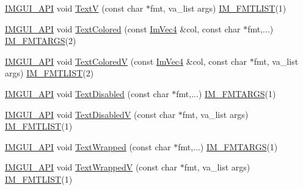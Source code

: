 \begin{DoxyCompactItemize}
\item 
\mbox{\hyperlink{imgui_8h_a43829975e84e45d1149597467a14bbf5}{I\+M\+G\+U\+I\+\_\+\+A\+PI}} void \mbox{\hyperlink{namespace_im_gui_a10a0d6362178c2f743092f21e1b6cd20}{TextV}} (const char $\ast$fmt, va\+\_\+list args) \mbox{\hyperlink{imgui_8h_a047693beb7f899f5deab1e20202016b3}{I\+M\+\_\+\+F\+M\+T\+L\+I\+ST}}(1)
\item 
\mbox{\hyperlink{imgui_8h_a43829975e84e45d1149597467a14bbf5}{I\+M\+G\+U\+I\+\_\+\+A\+PI}} void \mbox{\hyperlink{namespace_im_gui_a36ab8fcad68b26863d6e910755de04c2}{Text\+Colored}} (const \mbox{\hyperlink{struct_im_vec4}{Im\+Vec4}} \&col, const char $\ast$fmt,...) \mbox{\hyperlink{imgui_8h_a1251c2f9ddac0873dbad8181bd82c9f1}{I\+M\+\_\+\+F\+M\+T\+A\+R\+GS}}(2)
\item 
\mbox{\hyperlink{imgui_8h_a43829975e84e45d1149597467a14bbf5}{I\+M\+G\+U\+I\+\_\+\+A\+PI}} void \mbox{\hyperlink{namespace_im_gui_a87c24ece994188a7145d8feecb4439ed}{Text\+ColoredV}} (const \mbox{\hyperlink{struct_im_vec4}{Im\+Vec4}} \&col, const char $\ast$fmt, va\+\_\+list args) \mbox{\hyperlink{imgui_8h_a047693beb7f899f5deab1e20202016b3}{I\+M\+\_\+\+F\+M\+T\+L\+I\+ST}}(2)
\item 
\mbox{\hyperlink{imgui_8h_a43829975e84e45d1149597467a14bbf5}{I\+M\+G\+U\+I\+\_\+\+A\+PI}} void \mbox{\hyperlink{namespace_im_gui_aa96bf14c5fa288e106820aeb4ba7fcb6}{Text\+Disabled}} (const char $\ast$fmt,...) \mbox{\hyperlink{imgui_8h_a1251c2f9ddac0873dbad8181bd82c9f1}{I\+M\+\_\+\+F\+M\+T\+A\+R\+GS}}(1)
\item 
\mbox{\hyperlink{imgui_8h_a43829975e84e45d1149597467a14bbf5}{I\+M\+G\+U\+I\+\_\+\+A\+PI}} void \mbox{\hyperlink{namespace_im_gui_a5b128d4f12d7e33e95fb9cef7dce027e}{Text\+DisabledV}} (const char $\ast$fmt, va\+\_\+list args) \mbox{\hyperlink{imgui_8h_a047693beb7f899f5deab1e20202016b3}{I\+M\+\_\+\+F\+M\+T\+L\+I\+ST}}(1)
\item 
\mbox{\hyperlink{imgui_8h_a43829975e84e45d1149597467a14bbf5}{I\+M\+G\+U\+I\+\_\+\+A\+PI}} void \mbox{\hyperlink{namespace_im_gui_ad57bb15c599e73b2ccc7c0f7de6e5823}{Text\+Wrapped}} (const char $\ast$fmt,...) \mbox{\hyperlink{imgui_8h_a1251c2f9ddac0873dbad8181bd82c9f1}{I\+M\+\_\+\+F\+M\+T\+A\+R\+GS}}(1)
\item 
\mbox{\hyperlink{imgui_8h_a43829975e84e45d1149597467a14bbf5}{I\+M\+G\+U\+I\+\_\+\+A\+PI}} void \mbox{\hyperlink{namespace_im_gui_a9019a388cd0c410bcb3d3ae63a008123}{Text\+WrappedV}} (const char $\ast$fmt, va\+\_\+list args) \mbox{\hyperlink{imgui_8h_a047693beb7f899f5deab1e20202016b3}{I\+M\+\_\+\+F\+M\+T\+L\+I\+ST}}(1)

\end{DoxyCompactItemize}

